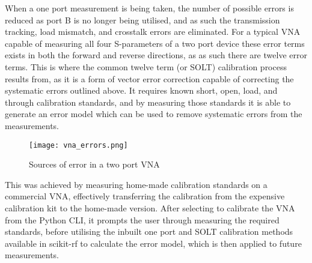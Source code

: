 When a one port measurement is being taken, the number of possible errors is reduced as port B is no longer being utilised, and as such the transmission tracking, load mismatch, and crosstalk errors are eliminated. For a typical VNA capable of measuring all four S-parameters of a two port device these error terms exists in both the forward and reverse directions, as as such there are twelve error terms. This is where the common twelve term (or SOLT) calibration process results from, as it is a form of vector error correction capable of correcting the systematic errors outlined above. It requires known short, open, load, and through calibration standards, and by measuring those standards it is able to generate an error model which can be used to remove systematic errors from the measurements. 

\begin{figure}[H]
	\centering
	\texttt{[image: vna\_errors.png]}
	\caption{Sources of error in a two port VNA}
	\label{fig:vna_error}
\end{figure}

This was achieved by measuring home-made calibration standards on a commercial VNA, effectively transferring the calibration from the expensive calibration kit to the home-made version. After selecting to calibrate the VNA from the Python CLI, it prompts the user through measuring the required standards, before utilising the inbuilt one port and SOLT calibration methods available in scikit-rf to calculate the error model, which is then applied to future measurements.



